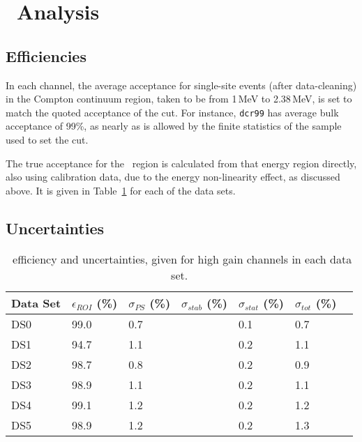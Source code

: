 %

\section{\MJ\ Analysis}
\subsection{Efficiencies}
In each channel, the average acceptance for single-site events (after data-cleaning) in the Compton continuum region, taken to be from 1\,MeV to 2.38\,MeV, is set to match the quoted acceptance of the cut. For instance, {\tt dcr99} has average bulk acceptance of 99\%, as nearly as is allowed by the finite statistics of the sample used to set the cut. 

The true acceptance for the \nonubb\ region is calculated from that energy region directly, also using calibration data, due to the energy non-linearity effect, as discussed above. It is given in Table~\ref{tab:DS_efficiencies} for each of the data sets.  

\subsection{Uncertainties}

\begin{table}[]
\centering
\begin{tabular}{l l l l l l l}
Data Set & $\epsilon_{ROI}$ (\%) & $\sigma_{PS}$ (\%) & $\sigma_{stab}$  (\%) & $\sigma_{stat}$  (\%) &$\sigma_{tot}$ (\%) \\ 
\hline
DS0  & 99.0  &  0.7  &    &  0.1  &  0.7 \\   
DS1  & 94.7  &  1.1  &    &  0.2  &  1.1 \\
DS2  & 98.7  &  0.8  &    &  0.2  &  0.9 \\
DS3  & 98.9  &  1.1  &    &  0.2  &  1.1 \\
DS4  & 99.1  &  1.2  &    &  0.2  &  1.2 \\
DS5  & 98.9  &  1.2  &    &  0.2  &  1.3 \\
\end{tabular}
 \caption[\nonubb\ efficiency and uncertainties in the \MJ\ \DEM]{\nonubb\ efficiency and uncertainties, given for high gain channels in each data set.} 
 \label{tab:DS_efficiencies}
\end{table}

